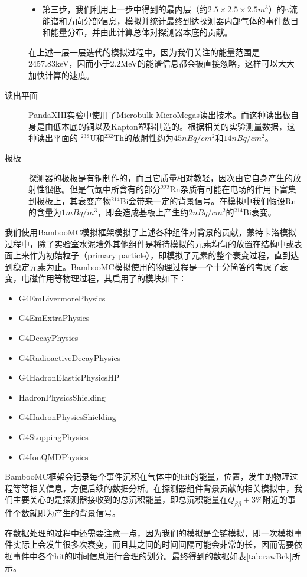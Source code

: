 \begin{description}
\begin{itemize}
        \item 第三步，我们利用上一步中得到的最内层（约$2.5\times2.5\times2.5m^3$）的$\gamma$流能谱和方向分部信息，模拟并统计最终到达探测器内部气体的事件数目和能量分布，并由此计算总体对探测器本底的贡献。
    \end{itemize}
    在上述一层一层迭代的模拟过程中，因为我们关注的能量范围是2457.83keV，因而小于2.2MeV的能谱信息都会被直接忽略，这样可以大大加快计算的速度。
    \item[读出平面]PandaXIII实验中使用了Microbulk MicroMegas读出技术。而这种读出板自身是由低本底的铜以及Kapton塑料制造的。根据相关的实验测量数据，这种读出平面的
    $^{238}$U和$^{232}$Th的放射性约为$45nBq/cm^2$和$14nBq/cm^2$。
    \item[极板]探测器的极板是有铜制作的，而且它质量相对教轻，因次由它自身产生的放射性很低。但是气氙中所含有的部分$^{222}$Rn杂质有可能在电场的作用下富集到极板上，其衰变产物$^{214}$Bi会带来一定的背景信号。在模拟中我们假设Rn的含量为$1mBq/m^3$，即会造成基板上产生约$2nBq/cm^2$的$^{214}$Bi衰变。
\end{description}

我们使用BambooMC模拟框架模拟了上述各种组件对背景的贡献，蒙特卡洛模拟过程中，除了实验室水泥墙外其他组件是将待模拟的元素均匀的放置在结构中或表面上来作为初始粒子（primary particle），即模拟了元素的整个衰变过程，直到达到稳定元素为止。BambooMC模拟使用的物理过程是一个十分简答的考虑了衰变，电磁作用等物理过程，其启用了的模块如下：
\begin{itemize}
    \item G4EmLivermorePhysics
    \item G4EmExtraPhysics
    \item G4DecayPhysics
    \item G4RadioactiveDecayPhysics
    \item G4HadronElasticPhysicsHP
    \item HadronPhysicsShielding
    \item G4HadronPhysicsShielding
    \item G4StoppingPhysics
    \item G4IonQMDPhysics     
\end{itemize}
BambooMC框架会记录每个事件沉积在气体中的hit的能量，位置，发生的物理过程等等相关信息，方便后续的数据分析。在探测器组件背景贡献的相关模拟中，我们主要关心的是探测器接收到的总沉积能量，即总沉积能量在$Q_{\beta\beta}\pm3\%$附近的事件个数就即为产生的背景信号。

在数据处理的过程中还需要注意一点，因为我们的模拟是全链模拟，即一次模拟事件实际上会发生很多次衰变，而且其之间的时间间隔可能会非常的长，因而需要依据事件中各个hit的时间信息进行合理的划分。最终得到的数据如表\ref{tab:rawBck}所示。

